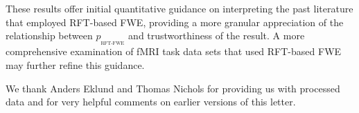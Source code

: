 \documentclass[9pt,twocolumn,twoside]{pnas-new}
\newcommand{\subtext}[2]{
#1_{_{\text{#2}}}
}
\begin{document}
These results offer initial quantitative guidance on interpreting the past literature that employed RFT-based FWE, providing a more granular appreciation of the relationship between $\subtext{p}{RFT-FWE}$ and trustworthiness of the result.
A more comprehensive examination of fMRI task data sets that used RFT-based FWE may further refine this guidance.

We thank Anders Eklund and Thomas Nichols for providing us with processed data and for very helpful comments on earlier versions of this letter.

\pnasbreak


\end{document}
